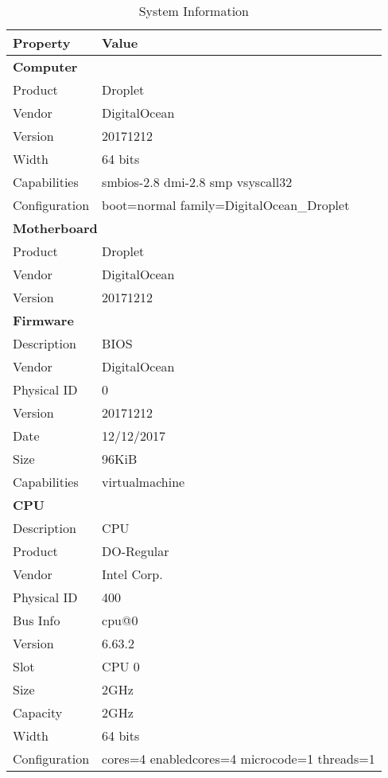 \documentclass{article}
\begin{document}
  \newpage
  \pagestyle{fancy} %
  \begin{table}[H]
    \centering
    \caption{System Information}
    \begin{tabular}{ll}
      \toprule
      \textbf{Property} & \textbf{Value} \\
      \midrule
      \multicolumn{2}{l}{\textbf{Computer}} \\
      Product & Droplet \\
      Vendor & DigitalOcean \\
      Version & 20171212 \\
      Width & 64 bits \\
      Capabilities & smbios-2.8 dmi-2.8 smp vsyscall32 \\
      Configuration & boot=normal family=DigitalOcean\_Droplet \\
      \midrule
      \multicolumn{2}{l}{\textbf{Motherboard}} \\
      Product & Droplet \\
      Vendor & DigitalOcean \\
      Version & 20171212 \\
      \midrule
      \multicolumn{2}{l}{\textbf{Firmware}} \\
      Description & BIOS \\
      Vendor & DigitalOcean \\
      Physical ID & 0 \\
      Version & 20171212 \\
      Date & 12/12/2017 \\
      Size & 96KiB \\
      Capabilities & virtualmachine \\
      \midrule
      \multicolumn{2}{l}{\textbf{CPU}} \\
      Description & CPU \\
      Product & DO-Regular \\
      Vendor & Intel Corp. \\
      Physical ID & 400 \\
      Bus Info & cpu@0 \\
      Version & 6.63.2 \\
      Slot & CPU 0 \\
      Size & 2GHz \\
      Capacity & 2GHz \\
      Width & 64 bits \\
      Configuration & cores=4 enabledcores=4 microcode=1 threads=1 \\

\end{tabular}
\end{table}
\end{document}
